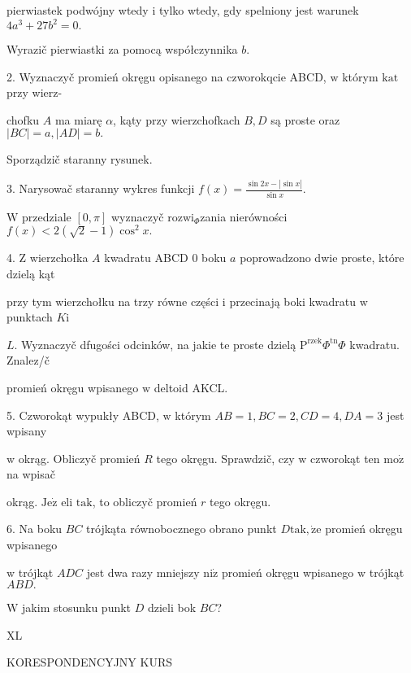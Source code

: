 \documentclass[a4paper,12pt]{article}
\begin{document}
pierwiastek podwójny wtedy $\mathrm{i}$ tylko wtedy, gdy spelniony jest warunek $4a^{3}+27b^{2}=0.$

Wyrazič pierwiastki za pomocą współczynnika $b.$

2. Wyznaczyč promień okręgu opisanego na czworokqcie ABCD, $\mathrm{w}$ którym $\mathrm{k}\mathrm{a}\mathrm{t}$ przy wierz-

chofku $A$ ma miarę $\alpha$, kąty przy wierzchofkach $B, D$ są proste oraz $|BC|=a, |AD|=b.$

Sporządzič staranny rysunek.

3. Narysowač staranny wykres funkcji $f(x)=\displaystyle \frac{\sin 2x-|\sin x|}{\sin x}.$

$\mathrm{W}$ przedziale $[0,\pi]$ wyznaczyč $\mathrm{r}\mathrm{o}\mathrm{z}\mathrm{w}\mathrm{i}_{\Phi}$zania nierówności $f(x)<2(\sqrt{2}-1)\cos^{2}x.$

4. $\mathrm{Z}$ wierzchołka $A$ kwadratu ABCD $0$ boku $a$ poprowadzono dwie proste, które dzielą kąt

przy tym wierzchołku na trzy równe części $\mathrm{i}$ przecinają boki kwadratu $\mathrm{w}$ punktach $K\mathrm{i}$

$L$. Wyznaczyč dfugości odcinków, na jakie te proste dzielą $\mathrm{P}^{\mathrm{r}\mathrm{z}\mathrm{e}\mathrm{k}}\Phi^{\mathrm{t}\mathrm{n}}\Phi$ kwadratu. Znalez/č

promień okręgu wpisanego $\mathrm{w}$ deltoid AKCL.

5. Czworokąt wypukły ABCD, $\mathrm{w}$ którym $AB=1, BC=2, CD=4, DA=3$ jest wpisany

$\mathrm{w}$ okrąg. Obliczyč promień $R$ tego okręgu. Sprawdzič, czy $\mathrm{w}$ czworokąt ten $\mathrm{m}\mathrm{o}\dot{\mathrm{z}}$ na wpisač

okrąg. $\mathrm{J}\mathrm{e}\dot{\mathrm{z}}$ eli $\mathrm{t}\mathrm{a}\mathrm{k}$, to obliczyč promień $r$ tego okręgu.

6. Na boku $BC$ trójkąta równobocznego obrano punkt $D\mathrm{t}\mathrm{a}\mathrm{k}, \dot{\mathrm{z}}\mathrm{e}$ promień okręgu wpisanego

$\mathrm{w}$ trójkąt $ADC$ jest dwa razy mniejszy $\mathrm{n}\mathrm{i}\dot{\mathrm{z}}$ promień okręgu wpisanego $\mathrm{w}$ trójkąt $ABD.$

$\mathrm{W}$ jakim stosunku punkt $D$ dzieli bok $BC$?





XL

KORESPONDENCYJNY KURS
\end{document}

